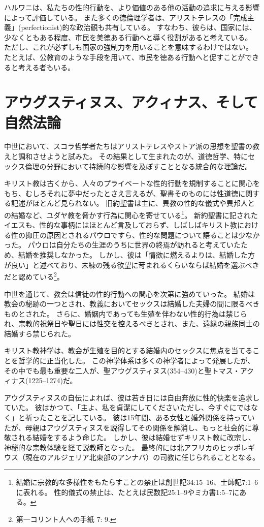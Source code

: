 \documentclass[paper=a4,book,openany]{jlreq} \usepackage{mystyle}
\begin{document}
 ハルワニは、私たちの性的行動を、より価値のある他の活動の追求に与える影響によって評価している。
また多くの徳倫理学者は、アリストテレスの「完成主義」(perfectionist)的な政治観も共有している。
すなわち、彼らは、国家には、少なくともある程度、市民を美徳ある行動へと導く役割があると考えている。
ただし、これが必ずしも国家の強制力を用いることを意味するわけではない。
たとえば、公教育のような手段を用いて、市民を徳ある行動へと促すことができると考える者もいる。

\section{アウグスティヌス、アクィナス、そして自然法論}

中世において、スコラ哲学者たちはアリストテレスやストア派の思想を聖書の教えと調和させようと試みた。
その結果として生まれたのが、道徳哲学、特にセックス倫理の分野において持続的な影響を及ぼすこととなる統合的な理論だ。

キリスト教は古くから、人々のプライベートな性的行動を規制することに関心をもち、むしろそれに夢中だったとさえ言えるが、聖書そのものには性道徳に関する記述がほとんど見られない。
旧約聖書は主に、異教の性的な儀式や異邦人との結婚など、ユダヤ教を脅かす行為に関心を寄せている\footnote{結婚に宗教的な多様性をもたらすことの禁止は創世記34:15--16、士師記7:1--6に表れる。
性的儀式の禁止は、たとえば民数記25:1--9やミカ書1:5--7にある。
}。
新約聖書に記されたイエスも、性的な事柄にはほとんど言及しておらず、しばしばキリスト教における性の抑圧の原因とされるパウロですら、性的な問題について語ることは少なかった。
パウロは自分たちの生涯のうちに世界の終焉が訪れると考えていたため、結婚を推奨しなかった。
しかし、彼は「情欲に燃えるよりは、結婚した方が良い」と述べており、未練の残る欲望に苛まれるくらいならば結婚を選ぶべきだと認めている\footnote{第一コリント人への手紙 7: 9.}。

中世を通じて、教会は信徒の性的行動への関心を次第に強めていった。
結婚は教会の秘跡の一つとされ、教義においてセックスは結婚した夫婦の間に限るべきものとされた。
さらに、婚姻内であっても生殖を伴わない性的行為は禁じられ、宗教的祝祭日や聖日には性交を控えるべきとされ、また、遠縁の親族同士の結婚すら禁じられた。

キリスト教神学は、教会が生殖を目的とする結婚内のセックスに焦点を当てることを哲学的に正当化した。
この神学体系は多くの神学者によって発展したが、その中でも最も重要な二人が、聖アウグスティヌス(354--430)と聖トマス・アクィナス(1225--1274)だ。

アウグスティヌスの自伝によれば、彼は若き日には自由奔放に性的快楽を追求していた。
彼はかつて、「主よ、私を貞潔にしてください{\DDASH}ただし、今すぐにではなく」と祈ったことを記している。
彼は15年間、ある女性と婚外関係を持っていたが、母親はアウグスティヌスを説得してその関係を解消し、もっと社会的に尊敬される結婚をするよう命じた。
しかし、彼は結婚せずキリスト教に改宗し、神秘的な宗教体験を経て説教師となった。
最終的には北アフリカのヒッポレギウス（現在のアルジェリア北東部のアンナバ）の司教に任じられることとなる。
\end{document}
